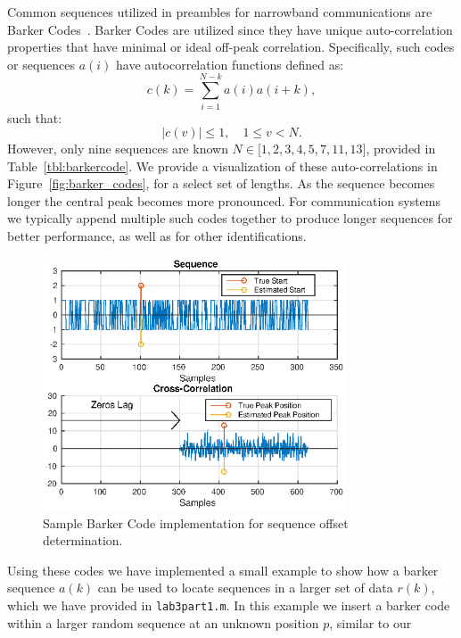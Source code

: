 \documentclass[letterpaper,12pt]{article}
\begin{document}
%
Common sequences utilized in preambles for narrowband communications are Barker Codes~\cite{barke1953group}. 
 Barker Codes are utilized since they have unique auto-correlation properties that have minimal or ideal 
off-peak correlation.  Specifically, such codes or sequences $a(i)$ have autocorrelation functions defined as:
\begin{equation}
 c(k) = \sum_{i=1}^{N-k} a(i) a(i+k),
\end{equation}
%
such that:
%
\begin{equation}
 \lvert c(v) \rvert \le 1, \quad 1\le v < N.
\end{equation}
However, only nine sequences are known $N\in\big[1, 2, 3, 4, 5, 7, 11, 13\big]$, provided in 
Table~\ref{tbl:barkercode}.  We provide a visualization of these auto-correlations in 
Figure~\ref{fig:barker_codes}, for a select set of lengths.  As the sequence becomes longer the central peak 
becomes more pronounced.  For communication systems we typically append multiple such codes together to 
produce longer sequences for better performance, as well as for other identifications.\par
%
\begin{figure}[ht!]\label{fig:barker_search}
 \centering
 \includegraphics[width=0.8\textwidth]{searchBarker.eps}
\caption{Sample Barker Code implementation for sequence offset determination.}
\end{figure}
%
Using these codes we have implemented a small example to show how a barker sequence $a(k)$ can be used to 
locate sequences in a larger set of data $r(k)$, which we have provided in \texttt{lab3part1.m}.  In this 
example we insert a barker code within a larger random sequence at an unknown position $p$, similar to our 
\end{document}
